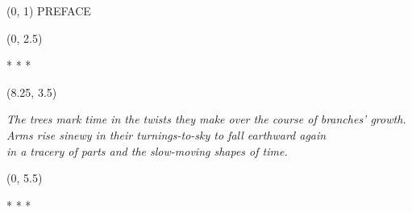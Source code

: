 \documentclass[10pt]{article}
\begin{document}
\begin{textblock}{23}(0, 1)
\center \huge PREFACE
\end{textblock}

\begin{textblock}{23}(0, 2.5)
\begin{center}
* * *
\end{center}
\end{textblock}

\begin{textblock}{6.5}(8.25, 3.5)
\begin{center} \textit{The trees mark time in the twists they make over the
course of branches' growth. Arms rise sinewy in their turnings-to-sky to fall
earthward again \\ in a tracery of parts and the slow-moving shapes of time. }
\end{center}
\end{textblock}

\begin{textblock}{23}(0, 5.5)
\begin{center}
* * *
\end{center}
\end{textblock}
\end{document}
